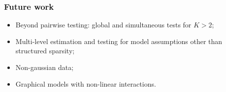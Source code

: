 \documentclass[10pt]{beamer}
\theoremstyle{definition}
\begin{document}
\begin{frame}
\frametitle{Future work}

\begin{itemize}
\item Beyond pairwise testing: global and simultaneous tests for $K > 2$;

\vspace{1em}
\item Multi-level estimation and testing for model assumptions other than structured sparsity;

\vspace{1em}
\item Non-gaussian data;

\vspace{1em}
\item {\colbbf Graphical models with non-linear interactions}.
\end{itemize}
\end{frame}
\end{document}
